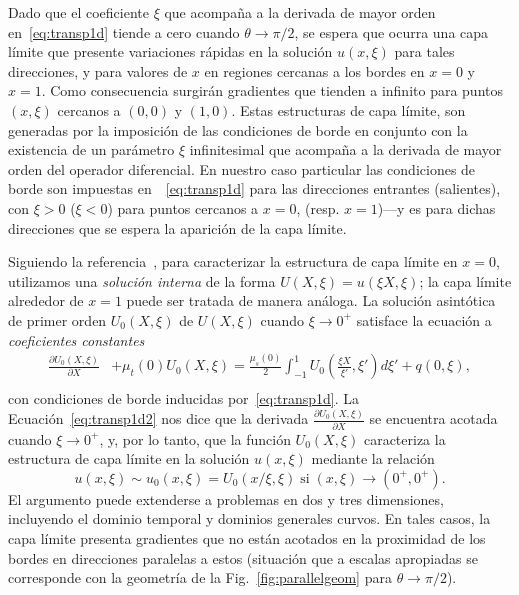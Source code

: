 Dado que el coeficiente $\xi$ que acompaña a la derivada de mayor 
orden en~\eqref{eq:transp1d} tiende a cero cuando $\theta \to \pi/2$, 
se espera que ocurra una capa límite que presente variaciones rápidas 
en la solución $u(x,\xi)$ para tales direcciones, y para valores 
de $x$ en regiones cercanas a los bordes en $x=0$ y $x=1$.
Como consecuencia surgirán gradientes que 
tienden a infinito para puntos $(x,\xi)$ cercanos a $(0,0)$ y $(1,0)$. 
Estas estructuras de capa límite,  son generadas por 
la imposición de las condiciones de borde en conjunto con la existencia 
de un parámetro $\xi$ infinitesimal que acompaña a la derivada de mayor 
orden del operador diferencial. En nuestro caso particular 
las condiciones de borde son impuestas en~~\eqref{eq:transp1d} para las direcciones 
entrantes (salientes), con $\xi>0$ ($\xi<0$) para puntos cercanos 
a $x=0$, (resp. $x=1$)---y es para dichas direcciones que 
se espera la aparición de la capa límite.

Siguiendo la referencia~\cite{Bender1999}, para caracterizar
la estructura de capa límite en \eg $x=0$, utilizamos una 
{\em solución interna} de la forma $U(X,\xi) = u(\xi X,\xi)$; 
la capa límite alrededor de $x=1$ puede ser tratada de manera 
análoga. La solución asintótica de primer orden $U_0(X,\xi)$ 
de $U(X,\xi)$ cuando $\xi\to 0^+$ satisface la ecuación 
a {\em coeficientes constantes} 
\begin{equation}
\begin{split}
\frac{\partial U_0(X,\xi)}{\partial X}& + \mu_t(0) U_0(X,\xi)=\frac{\mu_s(0)}{2} 
\int_{-1}^{1} U_0\left(\frac{\xi X}{\xi'},\xi'\right) d\xi' +q(0,\xi),\\
\end{split}
\label{eq:transp1d2}
\end{equation}
con condiciones de borde inducidas por~\eqref{eq:transp1d}. 
La Ecuación~\eqref{eq:transp1d2} nos dice que la derivada 
$\frac{\partial U_0(X,\xi)}{\partial X}$ se encuentra 
acotada cuando $\xi\to 0^+$, y, por lo tanto, que la función 
$U_0(X,\xi)$ caracteriza la estructura de capa límite 
en la solución $u(x,\xi)$ mediante la relación 
\begin{equation}
  u(x,\xi)\sim u_0(x,\xi) = U_0(x/\xi,\xi) \; \text{si}  \;  (x,\xi)\to (0^+,0^+).
\end{equation}
El argumento puede extenderse a problemas en dos y tres dimensiones, 
incluyendo el dominio temporal y dominios generales curvos. En tales casos, 
la capa límite presenta gradientes que no están acotados 
en la proximidad de los bordes en direcciones paralelas a estos 
(situación que a escalas apropiadas se corresponde con la geometría 
de la Fig.~\ref{fig:parallelgeom} para $\theta \to \pi/2$). 

